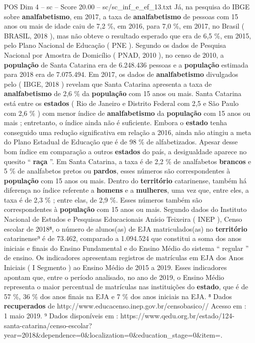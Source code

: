 \begin{textsample}{POS Dim 4 – sc – Score 20.00 – sc/sc\_inf\_e\_ef\_13.txt}
Já, na pesquisa do IBGE sobre \textbf{analfabetismo}, em 2017, a taxa de \textbf{analfabetismo} de pessoas com 15 anos ou mais de idade caiu de 7,2 \%, em 2016, para 7,0 \%, em 2017, no Brasil ( BRASIL, 2018 ), mas não obteve o resultado esperado que era de 6,5 \%, em 2015, pelo Plano Nacional de Educação ( PNE ).
Segundo os dados de Pesquisa Nacional por Amostra de Domicílio ( PNAD, 2010 ), no censo de 2010, a \textbf{população} de Santa Catarina era de 6.248.436 pessoas e a \textbf{população} estimada para 2018 era de 7.075.494.
Em 2017, os dados de \textbf{analfabetismo} divulgados pelo ( IBGE, 2018 ) revelam que Santa Catarina apresenta a taxa de \textbf{analfabetismo} de 2,6 \% da \textbf{população} com 15 anos ou mais.
Santa Catarina está entre os \textbf{estados} ( Rio de Janeiro e Distrito Federal com 2,5 e São Paulo com 2,6 \% ) com menor índice de \textbf{analfabetismo} da \textbf{população} com 15 anos ou mais ; entretanto, o índice ainda não é suficiente.
Embora o \textbf{estado} tenha conseguido uma redução significativa em relação a 2016, ainda não atingiu a meta do Plano Estadual de Educação que é de 98 \% de alfabetizados.
Apesar desse bom índice em comparação a outros \textbf{estados} do país, a desigualdade aparece no quesito “ \textbf{raça} ”.
Em Santa Catarina, a taxa é de 2,2 \% de analfabetos \textbf{brancos} e 5 \% de analfabetos pretos ou \textbf{pardos}, esses números são correspondentes à \textbf{população} com 15 anos ou mais.
Dentro do \textbf{território} catarinense, também há diferença no índice referente a \textbf{homens} e a \textbf{mulheres}, uma vez que, entre eles, a taxa é de 2,3 \% ; entre elas, de 2,9 \%.
Esses números também são correspondentes à \textbf{população} com 15 anos ou mais.
Segundo dados do Instituto Nacional de Estudos e Pesquisas Educacionais Anísio Teixeira ( INEP ), Censo escolar de 2018⁸, o número de alunos(as) de EJA matriculados(as) no \textbf{território} catarinense⁹ é de 73.462, comparado a 1.094.524 que constitui a soma dos anos iniciais e finais do Ensino Fundamental e do Ensino Médio do sistema “ regular ” de ensino.
Os indicadores apresentam registros de matrículas em EJA dos Anos Iniciais ( I Segmento ) ao Ensino Médio de 2015 a 2019.
Esses indicadores apontam que, entre o período analisado, no ano de 2019, o Ensino Médio representa o maior percentual de matrículas nas instituições do \textbf{estado}, que é de 57 \%, 36 \% dos anos finais na EJA e 7 \% dos anos iniciais na EJA. ⁸ Dados \textbf{recuperados} de http://www.educacenso.inep.gov.br/censobasico// Acesso em : 1 maio 2019. ⁹ Dados disponíveis em : https://www.qedu.org.br/estado/124-santa-catarina/censo-escolar? year=2018\&dependence=0\&localization=0\&education\_stage=0\&item=.

\end{textsample}
